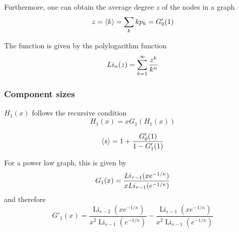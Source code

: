 Furthermore, one can obtain the average degree $z$ of the nodes in a graph 
\begin{equation}
	z = \left< k \right> = \sum_k k p_k = G'_0(1)
\end{equation}

The function is given by the polylogarithm function
\begin{equation}
	Li_{n} ({z}) = \sum_{k=1}^{\infty} \frac{z^k}{k^n}
\end{equation}

\subsubsection{Component sizes} %
\label{ssub:component_sizes}

$H_1(x)$ follows the recursive condition
\begin{equation}
	H_1(x) = x G_1( H_1(x))
\end{equation}


\begin{equation}
\left< s \right> = 1 + \frac{G'_0(1)}{1-G'_1(1)}	
\end{equation}


For a power law graph, this is given by
\begin{equation}
	G_1(x) = \frac{Li_{\tau-1} ({xe^{-1/\kappa}})}{xLi_{\tau-1} ({e^{-1/\kappa}})}
\end{equation}
and therefore
\begin{equation}
	G'_1(x) = \frac{\operatorname{Li}_{s - 2} \left(x e^{- 1/\kappa}\right)}
	               {x^{2} \operatorname{Li}_{s - 1}\left(e^{- 1/\kappa}\right)} -
	          \frac{\operatorname{Li}_{s - 1}\left(x e^{- 1/\kappa}\right)}
	               {x^{2} \operatorname{Li}_{s - 1}\left(e^{- 1/\kappa}\right)}
\end{equation}

